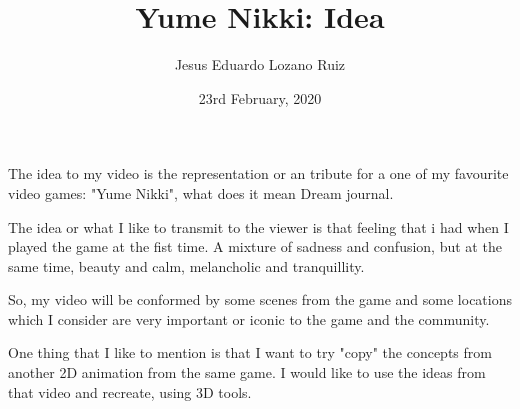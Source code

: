 \documentclass[12pt,letterpaper]{book}
\author{Jesus Eduardo Lozano Ruiz}
\title{Yume Nikki: Idea}
\date{23rd February, 2020}
\begin{document}
\maketitle
The idea to my video is the representation or an tribute for a one of my favourite video games: "Yume Nikki", what does it mean Dream journal.

The idea or what I like to transmit to the viewer is that feeling that i had when I played the game at the fist time. A mixture of sadness and confusion, but at the same time, beauty and calm, melancholic and 
tranquillity.

So, my video will be conformed by some scenes from the game and some locations which I consider are very important or iconic to the game and the community.

One thing that I like to mention is that I want to try "copy" the concepts from another 2D animation from the same game. I would like to use the ideas from that video and recreate, using 3D tools. 
\end{document}
